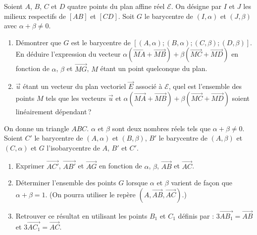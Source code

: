 \begin{exo}
      Soient $A$, $B$, $C$ et $D$ quatre points du plan affine r\'eel $\mathcal{E}$.
      On d\'esigne par $I$ et $J$ les milieux respectifs de $[AB]$ et $[CD]$.
      Soit $G$ le barycentre de $(I,\alpha)$ et $(J,\beta)$ avec $\alpha + \beta \neq 0$.
      \begin{enumerate}
            \item D\'emontrer que $G$ est le barycentre de $[(A,\alpha) ; (B,\alpha) ; (C,\beta) ; (D,\beta)]$.
                  En d\'eduire l'expression du vecteur 
                  $\alpha \left( \overrightarrow{MA} + \overrightarrow{MB} \right) + \beta \left( \overrightarrow{MC} + \overrightarrow{MD} \right)$
                  en fonction de $\alpha$, $\beta$ et $\overrightarrow{MG}$, $M$ \'etant un point quelconque du plan.
            \item $\vec{u}$ \'etant un vecteur du plan vectoriel $\overrightarrow{E}$ associ\'e \`a $\mathcal{E}$,
                  quel est l'ensemble des points $M$ tels que les vecteurs $\overrightarrow{u}$ et
                  $\alpha \left( \overrightarrow{MA} + \overrightarrow{MB} \right) + \beta \left( \overrightarrow{MC} + \overrightarrow{MD} \right)$
                  soient lin\'eairement d\'ependant\,?
      \end{enumerate}
\end{exo}
%
\begin{exo}
      On donne un triangle $ABC$.
      $\alpha$ et $\beta$ sont deux nombres r\'eels tels que $\alpha + \beta \neq 0$.
      Soient $C'$ le barycentre de $(A,\alpha)$ et $(B,\beta)$,
      $B'$ le barycentre de $(A,\beta)$ et $(C,\alpha)$ et 
      $G$ l'isobarycentre de $A$, $B'$ et $C'$.
      \begin{enumerate}
            \item Exprimer $\overrightarrow{AC'}$, $\overrightarrow{AB'}$ et $\overrightarrow{AG}$ en fonction de $\alpha$, $\beta$, $\overrightarrow{AB}$ et $\overrightarrow{AC}$.
            \item D\'eterminer l'ensemble des points $G$ lorsque $\alpha$ et $\beta$ 
                  varient de fa\c{c}on que $\alpha + \beta = 1$. (On pourra utiliser le rep\`ere $(A,\overrightarrow{AB},\overrightarrow{AC})$.)
            \item Retrouver ce r\'esultat en utilisant les points $B_1$ et $C_1$ d\'efinis par : 
                  $3\overrightarrow{AB_1} = \overrightarrow{AB}$ et $3\overrightarrow{AC_1} = \overrightarrow{AC}$.
      \end{enumerate}
\end{exo}
